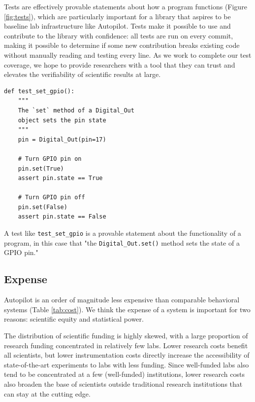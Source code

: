 Tests are effectively provable statements about how a program functions (Figure \ref{fig:tests}), which are particularly important for a library that aspires to be baseline lab infrastructure like Autopilot. Tests make it possible to use and contribute to the library with confidence: all tests are run on every commit, making it possible to determine if some new contribution breaks existing code without manually reading and testing every line. As we work to complete our test coverage, we hope to provide researchers with a tool that they can trust and elevates the verifiability of scientific results at large.

\begin{marginfigure}
\begin{verbatim}
def test_set_gpio():
    """
    The `set` method of a Digital_Out
    object sets the pin state
    """
    pin = Digital_Out(pin=17)

    # Turn GPIO pin on
    pin.set(True)
    assert pin.state == True

    # Turn GPIO pin off
    pin.set(False)
    assert pin.state == False
\end{verbatim}
\caption{A test like \texttt{test\_set\_gpio} is a provable statement about the functionality of a program, in this case that "the \texttt{Digital\_Out.set()} method sets the state of a GPIO pin."}
\label{fig:tests}
\end{marginfigure}

\subsection{Expense}
\label{sec:expense}

Autopilot is an order of magnitude less expensive than comparable behavioral systems (Table \ref{tab:cost}). We think the expense of a system is important for two reasons: scientific equity and statistical power. 

The distribution of scientific funding is highly skewed, with a large proportion of research funding concentrated in relatively few labs\citep{katzBiomedicalEliteInequality2017}. Lower research costs benefit all scientists, but lower instrumentation costs directly increase the accessibility of state-of-the-art experiments to labs with less funding. Since well-funded labs also tend to be concentrated at a few (well-funded) institutions, lower research costs also broaden the base of scientists outside traditional research institutions that can stay at the cutting edge\citep{ashkenasEvenAffirmativeAction2017,clausetSystematicInequalityHierarchy2015,pearceExpandingEquitableAccess2019}.

